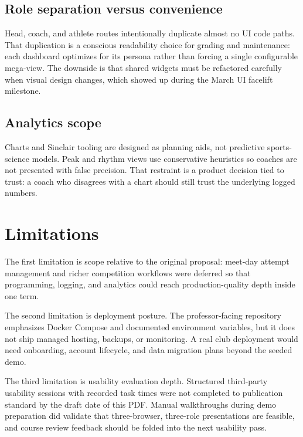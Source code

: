 \documentclass[
  letterpaper,
  DIV=11,
  numbers=noendperiod]{scrartcl}
\begin{document}
\subsection{Role separation versus
convenience}\label{role-separation-versus-convenience}

Head, coach, and athlete routes intentionally duplicate almost no UI
code paths. That duplication is a conscious readability choice for
grading and maintenance: each dashboard optimizes for its persona rather
than forcing a single configurable mega-view. The downside is that
shared widgets must be refactored carefully when visual design changes,
which showed up during the March UI facelift milestone.

\subsection{Analytics scope}\label{analytics-scope}

Charts and Sinclair tooling are designed as planning aids, not
predictive sports-science models. Peak and rhythm views use conservative
heuristics so coaches are not presented with false precision. That
restraint is a product decision tied to trust: a coach who disagrees
with a chart should still trust the underlying logged numbers.

\section{Limitations}\label{limitations}

The first limitation is scope relative to the original proposal:
meet-day attempt management and richer competition workflows were
deferred so that programming, logging, and analytics could reach
production-quality depth inside one term.

The second limitation is deployment posture. The professor-facing
repository emphasizes Docker Compose and documented environment
variables, but it does not ship managed hosting, backups, or monitoring.
A real club deployment would need onboarding, account lifecycle, and
data migration plans beyond the seeded demo.

The third limitation is usability evaluation depth. Structured
third-party usability sessions with recorded task times were not
completed to publication standard by the draft date of this PDF. Manual
walkthroughs during demo preparation did validate that three-browser,
three-role presentations are feasible, and course review feedback should
be folded into the next usability pass.
\end{document}
